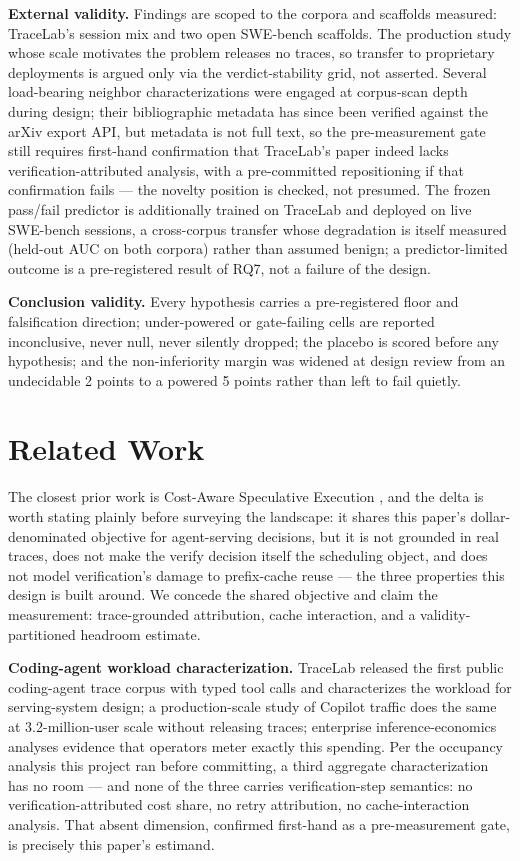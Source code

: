 \documentclass[11pt]{article}
\begin{document}
\textbf{External validity.} Findings are scoped to the corpora and scaffolds measured: TraceLab's session mix and two open SWE-bench scaffolds. The production study whose scale motivates the problem releases no traces, so transfer to proprietary deployments is argued only via the verdict-stability grid, not asserted. Several load-bearing neighbor characterizations were engaged at corpus-scan depth during design; their bibliographic metadata has since been verified against the arXiv export API, but metadata is not full text, so the pre-measurement gate still requires first-hand confirmation that TraceLab's paper indeed lacks verification-attributed analysis, with a pre-committed repositioning if that confirmation fails --- the novelty position is checked, not presumed. The frozen pass/fail predictor is additionally trained on TraceLab and deployed on live SWE-bench sessions, a cross-corpus transfer whose degradation is itself measured (held-out AUC on both corpora) rather than assumed benign; a predictor-limited outcome is a pre-registered result of RQ7, not a failure of the design.

\textbf{Conclusion validity.} Every hypothesis carries a pre-registered floor and falsification direction; under-powered or gate-failing cells are reported inconclusive, never null, never silently dropped; the placebo is scored before any hypothesis; and the non-inferiority margin was widened at design review from an undecidable 2 points to a powered 5 points rather than left to fail quietly.

\section{Related Work}

The closest prior work is Cost-Aware Speculative Execution \citep{CostAwareSpec2606}, and the delta is worth stating plainly before surveying the landscape: it shares this paper's dollar-denominated objective for agent-serving decisions, but it is not grounded in real traces, does not make the verify decision itself the scheduling object, and does not model verification's damage to prefix-cache reuse --- the three properties this design is built around. We concede the shared objective and claim the measurement: trace-grounded attribution, cache interaction, and a validity-partitioned headroom estimate.

\textbf{Coding-agent workload characterization.} TraceLab \citep{TraceLab2606} released the first public coding-agent trace corpus with typed tool calls and characterizes the workload for serving-system design; a production-scale study of Copilot traffic \citep{CopilotScale2608} does the same at 3.2-million-user scale without releasing traces; enterprise inference-economics analyses \citep{InferenceEcon2607} evidence that operators meter exactly this spending. Per the occupancy analysis this project ran before committing, a third aggregate characterization has no room --- and none of the three carries verification-step semantics: no verification-attributed cost share, no retry attribution, no cache-interaction analysis. That absent dimension, confirmed first-hand as a pre-measurement gate, is precisely this paper's estimand.
\end{document}
